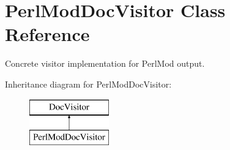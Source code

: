 \hypertarget{class_perl_mod_doc_visitor}{}\section{Perl\+Mod\+Doc\+Visitor Class Reference}
\label{class_perl_mod_doc_visitor}


Concrete visitor implementation for Perl\+Mod output.  


Inheritance diagram for Perl\+Mod\+Doc\+Visitor\+:\begin{figure}[H]
\begin{center}
\leavevmode
\includegraphics[height=2.000000cm]{class_perl_mod_doc_visitor}
\end{center}
\end{figure}
